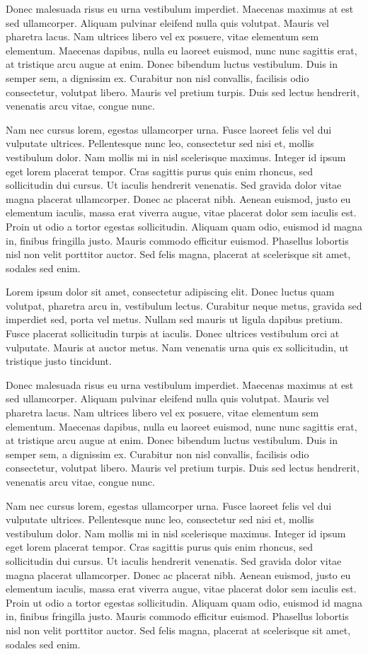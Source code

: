 \documentclass[
]{article}
\begin{document}
Donec malesuada risus eu urna vestibulum imperdiet. Maecenas maximus at
est sed ullamcorper. Aliquam pulvinar eleifend nulla quis volutpat.
Mauris vel pharetra lacus. Nam ultrices libero vel ex posuere, vitae
elementum sem elementum. Maecenas dapibus, nulla eu laoreet euismod,
nunc nunc sagittis erat, at tristique arcu augue at enim. Donec bibendum
luctus vestibulum. Duis in semper sem, a dignissim ex. Curabitur non
nisl convallis, facilisis odio consectetur, volutpat libero. Mauris vel
pretium turpis. Duis sed lectus hendrerit, venenatis arcu vitae, congue
nunc.

Nam nec cursus lorem, egestas ullamcorper urna. Fusce laoreet felis vel
dui vulputate ultrices. Pellentesque nunc leo, consectetur sed nisi et,
mollis vestibulum dolor. Nam mollis mi in nisl scelerisque maximus.
Integer id ipsum eget lorem placerat tempor. Cras sagittis purus quis
enim rhoncus, sed sollicitudin dui cursus. Ut iaculis hendrerit
venenatis. Sed gravida dolor vitae magna placerat ullamcorper. Donec ac
placerat nibh. Aenean euismod, justo eu elementum iaculis, massa erat
viverra augue, vitae placerat dolor sem iaculis est. Proin ut odio a
tortor egestas sollicitudin. Aliquam quam odio, euismod id magna in,
finibus fringilla justo. Mauris commodo efficitur euismod. Phasellus
lobortis nisl non velit porttitor auctor. Sed felis magna, placerat at
scelerisque sit amet, sodales sed enim.

Lorem ipsum dolor sit amet, consectetur adipiscing elit. Donec luctus
quam volutpat, pharetra arcu in, vestibulum lectus. Curabitur neque
metus, gravida sed imperdiet sed, porta vel metus. Nullam sed mauris ut
ligula dapibus pretium. Fusce placerat sollicitudin turpis at iaculis.
Donec ultrices vestibulum orci at vulputate. Mauris at auctor metus. Nam
venenatis urna quis ex sollicitudin, ut tristique justo tincidunt.

Donec malesuada risus eu urna vestibulum imperdiet. Maecenas maximus at
est sed ullamcorper. Aliquam pulvinar eleifend nulla quis volutpat.
Mauris vel pharetra lacus. Nam ultrices libero vel ex posuere, vitae
elementum sem elementum. Maecenas dapibus, nulla eu laoreet euismod,
nunc nunc sagittis erat, at tristique arcu augue at enim. Donec bibendum
luctus vestibulum. Duis in semper sem, a dignissim ex. Curabitur non
nisl convallis, facilisis odio consectetur, volutpat libero. Mauris vel
pretium turpis. Duis sed lectus hendrerit, venenatis arcu vitae, congue
nunc.

Nam nec cursus lorem, egestas ullamcorper urna. Fusce laoreet felis vel
dui vulputate ultrices. Pellentesque nunc leo, consectetur sed nisi et,
mollis vestibulum dolor. Nam mollis mi in nisl scelerisque maximus.
Integer id ipsum eget lorem placerat tempor. Cras sagittis purus quis
enim rhoncus, sed sollicitudin dui cursus. Ut iaculis hendrerit
venenatis. Sed gravida dolor vitae magna placerat ullamcorper. Donec ac
placerat nibh. Aenean euismod, justo eu elementum iaculis, massa erat
viverra augue, vitae placerat dolor sem iaculis est. Proin ut odio a
tortor egestas sollicitudin. Aliquam quam odio, euismod id magna in,
finibus fringilla justo. Mauris commodo efficitur euismod. Phasellus
lobortis nisl non velit porttitor auctor. Sed felis magna, placerat at
scelerisque sit amet, sodales sed enim.
\end{document}
